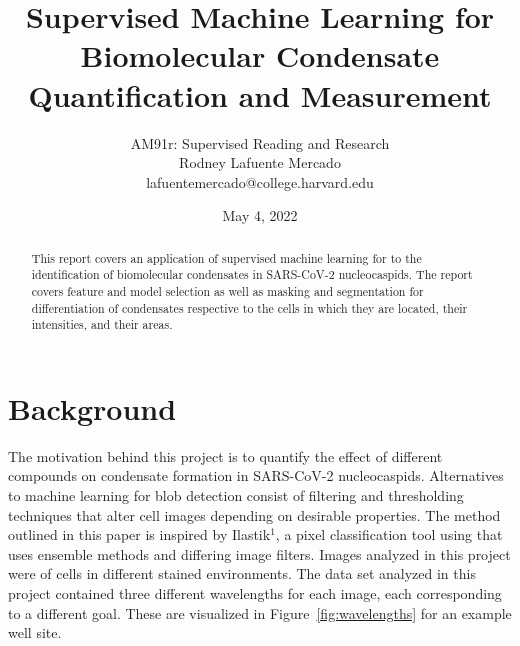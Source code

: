 \documentclass[12pt]{article}
\title{Supervised Machine Learning for Biomolecular Condensate Quantification and Measurement}
\author{AM91r: Supervised Reading and Research
\\ Rodney Lafuente Mercado 
\\ lafuentemercado@college.harvard.edu}
\date{May 4, 2022}
\begin{document}
\maketitle{}

\begin{abstract}
\noindent This report covers an application of supervised machine
learning for to the identification of biomolecular condensates in SARS-CoV-2 nucleocaspids. The
report covers feature and model selection as well as masking and segmentation for differentiation
of condensates respective to the cells in which they are located, their intensities, and their areas.

\end{abstract}

\section{Background}

The motivation behind this project is to quantify the effect of different compounds on condensate
formation in SARS-CoV-2 nucleocaspids. Alternatives to machine learning for blob detection consist
of filtering and thresholding techniques that alter cell images depending on desirable properties.
The method outlined in this paper is inspired by Ilastik$^1$, a pixel classification tool using that
uses ensemble methods and differing image filters. Images analyzed in this project were of cells in
different stained environments. The data set analyzed in this project contained three different
wavelengths for each image, each corresponding to a different goal. These are visualized in
Figure~\ref{fig:wavelengths} for an example well site.
\end{document}
